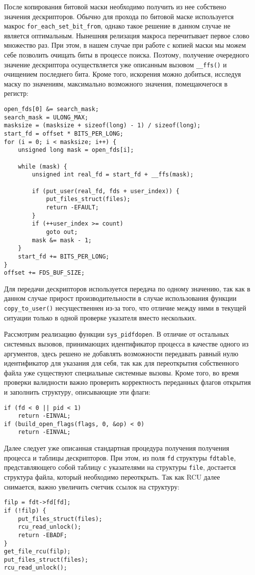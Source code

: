 После копирования битовой маски необходимо получить из нее собствено значения
дескрипторов. Обычно для прохода по битовой маске используется макрос
\texttt{for\_each\_set\_bit\_from}, однако такое решение в данном случае не
является оптимальным. Нынешняя релизация макроса перечитывает первое слово
множество раз. При этом, в нашем случае при работе с копией маски мы можем себе
позволить очищать биты в процессе поиска. Поэтому, получение очередного значение
дескриптора осуществляется уже описанным вызовом \texttt{\_\_ffs()} и очищением
последнего бита. Кроме того, искорения можно добиться, исследуя маску по
значениям, максимально возможного значения, помещаючегося в регистр:
\medskip
\begin{lstlisting}[style=cstyle]
open_fds[0] &= search_mask;
search_mask = ULONG_MAX;
masksize = (masksize + sizeof(long) - 1) / sizeof(long);
start_fd = offset * BITS_PER_LONG;
for (i = 0; i < masksize; i++) {
	unsigned long mask = open_fds[i];

	while (mask) {
		unsigned int real_fd = start_fd + __ffs(mask);

		if (put_user(real_fd, fds + user_index)) {
			put_files_struct(files);
			return -EFAULT;
		}
		if (++user_index >= count)
			goto out;
		mask &= mask - 1;
	}
	start_fd += BITS_PER_LONG;
}
offset += FDS_BUF_SIZE;
\end{lstlisting}
\medskip

Для передачи дескрипторов используется передача по одному значению, так как
в данном случае прирост производительности в случае использования функции
\texttt{copy\_to\_user()} несущественнен из-за того, что отличие между ними в
текущей ситуации только в одной проверке указателя вместо нескольких.

Рассмотрим реализацию функции \texttt{sys\_pidfdopen}. В отличие от остальных
системных вызовов, принимающих идентификатор процесса в качестве одного из
аргументов, здесь решено не добавлять возможности передавать равный нулю
идентификатор для указания для себя, так как для переоткрытия собственного файла
уже существуют специальные системные вызовы. Кроме того, во время проверки
валидности важно проверить корректность переданных флагов открытия и заполнить
структуру, описывающие эти флаги:
\medskip
\begin{lstlisting}[style=cstyle]
if (fd < 0 || pid < 1)
	return -EINVAL;
if (build_open_flags(flags, 0, &op) < 0)
	return -EINVAL;
\end{lstlisting}
\medskip

Далее следует уже описанная стандартная процедура получения получения процесса и
таблицы дескрипторов. При этом, из поля \texttt{fd} структуры \texttt{fdtable},
представляющего собой таблицу с указателями на структуры \texttt{file},
достается структура файла, который необходимо переоткрыть. Так как RCU далее
снимается, важно увеличить счетчик ссылок на структуру:
\medskip
\begin{lstlisting}[style=cstyle]
filp = fdt->fd[fd];
if (!filp) {
	put_files_struct(files);
	rcu_read_unlock();
	return -EBADF;
}
get_file_rcu(filp);
put_files_struct(files);
rcu_read_unlock();
\end{lstlisting}
\medskip

